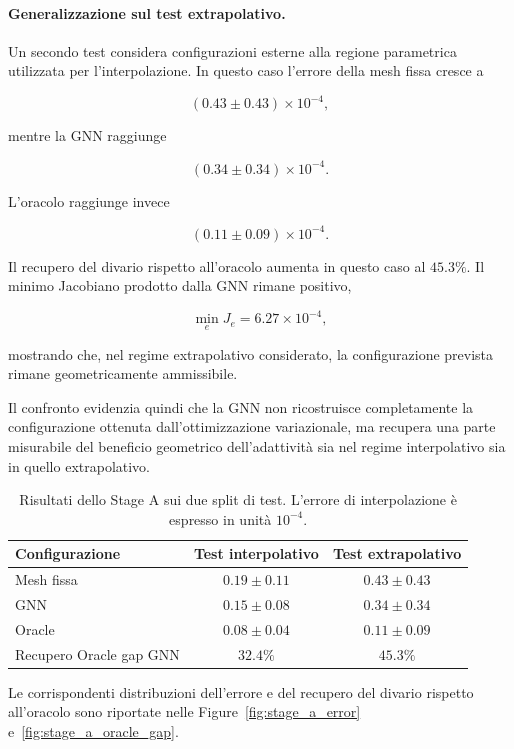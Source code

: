 \paragraph{Generalizzazione sul test extrapolativo.}

Un secondo test considera configurazioni esterne alla regione parametrica utilizzata per l'interpolazione. In questo caso l'errore della mesh fissa cresce a

\[
(0.43\pm0.43)\times10^{-4},
\]

mentre la GNN raggiunge

\[
(0.34\pm0.34)\times10^{-4}.
\]

L'oracolo raggiunge invece

\[
(0.11\pm0.09)\times10^{-4}.
\]

Il recupero del divario rispetto all'oracolo aumenta in questo caso al $45.3\%$. Il minimo Jacobiano prodotto dalla GNN rimane positivo,

\[
\min_e J_e = 6.27\times10^{-4},
\]

mostrando che, nel regime extrapolativo considerato, la configurazione prevista rimane geometricamente ammissibile.

Il confronto evidenzia quindi che la GNN non ricostruisce completamente la configurazione ottenuta dall'ottimizzazione variazionale, ma recupera una parte misurabile del beneficio geometrico dell'adattività sia nel regime interpolativo sia in quello extrapolativo.

\begin{table}[htbp]
\centering
\small
\setlength{\tabcolsep}{4.5pt}
\caption{Risultati dello Stage A sui due split di test. L'errore di interpolazione è espresso in unità $10^{-4}$.}
\label{tab:stage_a_benchmark}
\begin{tabular*}{\linewidth}{@{\extracolsep{\fill}}lcc@{}}
\toprule
Configurazione & Test interpolativo & Test extrapolativo \\
\midrule
Mesh fissa              & $0.19 \pm 0.11$ & $0.43 \pm 0.43$ \\
GNN                     & $0.15 \pm 0.08$ & $0.34 \pm 0.34$ \\
Oracle                  & $0.08 \pm 0.04$ & $0.11 \pm 0.09$ \\
\midrule
Recupero Oracle gap GNN & $32.4\%$        & $45.3\%$ \\
\bottomrule
\end{tabular*}
\end{table}

Le corrispondenti distribuzioni dell'errore e del recupero del divario rispetto all'oracolo sono riportate nelle Figure~\ref{fig:stage_a_error} e~\ref{fig:stage_a_oracle_gap}.

